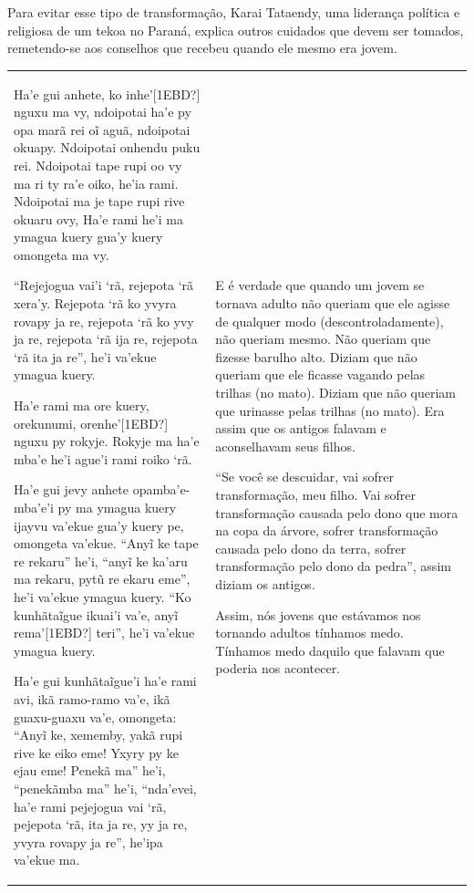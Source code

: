Para evitar esse tipo de transformação, Karai Tataendy, uma liderança
política e religiosa de um tekoa no Paraná, explica outros cuidados que
devem ser tomados, remetendo-se aos conselhos que recebeu quando ele
mesmo era jovem. 

\begin{flushleft}
\tablehead{}
\begin{supertabular}{m{2.86916in}|m{2.88726in}}
Ha’e gui anhete, ko inhe’[1EBD?] nguxu ma vy, ndoipotai ha’e py opa marã
rei oĩ aguã, ndoipotai okuapy. Ndoipotai onhendu puku rei. Ndoipotai
tape rupi oo vy ma ri ty ra’e oiko, he’ia rami. Ndoipotai ma je tape
rupi  rive okuaru ovy, Ha’e rami he’i ma ymagua kuery gua’y kuery
omongeta ma vy. 

``Rejejogua vai’i ‘rã, rejepota ‘rã xera’y. Rejepota ‘rã ko yvyra rovapy
ja re, rejepota ‘rã ko yvy ja re, rejepota ‘rã ija re, rejepota ‘rã ita
ja re'', he’i va’ekue ymagua kuery. 

Ha’e rami ma ore kuery, orekunumi, orenhe’[1EBD?] nguxu py rokyje.
Rokyje ma ha’e mba’e he’i ague’i rami roiko ‘rã. 

Ha’e gui jevy anhete opamba’e-mba’e’i py ma ymagua kuery ijayvu va’ekue
gua’y kuery pe, omongeta va’ekue. ``Anyĩ ke tape re rekaru'' he’i,
``anyĩ ke ka’aru ma rekaru, pytũ re ekaru eme'', he’i va’ekue ymagua
kuery. ``Ko kunhãtaĩgue ikuai’i va’e, anyĩ rema’[1EBD?] teri'',
he’i va’ekue ymagua kuery. 

Ha’e gui kunhãtaĩgue’i ha’e rami avi, ikã ramo-ramo va’e, ikã
guaxu-guaxu va’e, omongeta: ``Anyĩ ke, xememby, yakã rupi rive ke
eiko eme! Yxyry py ke ejau eme! Penekã ma'' he’i, ``penekãmba ma'' he’i,
``nda’evei, ha’e rami pejejogua vai ‘rã, pejepota ‘rã, ita ja re, yy ja
re, yvyra rovapy ja re'', he’ipa va’ekue ma. &
E é verdade que quando um jovem se tornava adulto não queriam que ele
agisse de qualquer modo (descontroladamente), não queriam mesmo. Não
queriam que fizesse barulho alto. Diziam que não queriam que ele
ficasse vagando pelas trilhas (no mato). Diziam que não queriam que
urinasse pelas trilhas (no mato). Era assim que os antigos falavam e
aconselhavam seus filhos. 

``Se você se descuidar, vai sofrer transformação, meu filho. Vai sofrer
transformação causada pelo dono que mora na copa da árvore, sofrer
transformação causada pelo dono da terra, sofrer transformação pelo
dono da pedra'', assim diziam os antigos. 

Assim, nós jovens que estávamos nos tornando adultos tínhamos medo.
Tínhamos medo daquilo que falavam que poderia nos acontecer. 


\end{supertabular}
\end{flushleft}
